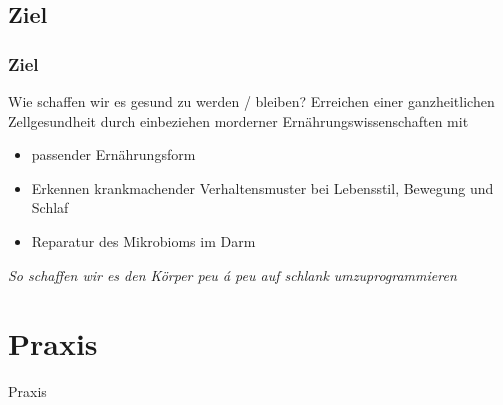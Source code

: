 \documentclass[xcolor=dvipsnames]{beamer}
\begin{document}
    \subsection{Ziel}
    \begin{frame}
        \frametitle{Ziel}
        \begin{block}{Wie schaffen wir es gesund zu werden / bleiben?}
            Erreichen einer ganzheitlichen Zellgesundheit durch einbeziehen morderner Ernährungswissenschaften mit
            \begin{itemize}
                \item passender Ernährungsform
                \item Erkennen krankmachender Verhaltensmuster bei Lebensstil, Bewegung und Schlaf
                \item Reparatur des Mikrobioms im Darm
            \end{itemize}
        \end{block}

        \textit{So schaffen wir es den Körper peu á peu auf schlank umzuprogrammieren}

    \end{frame}

    \section{Praxis}
    {
        \begin{frame}
            \begin{center}
                \Huge Praxis
            \end{center}
        \end{frame}
    }
\end{document}
